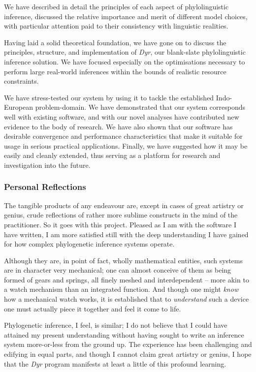 \documentclass[10pt,journal,compsoc]{IEEEtran}
\begin{document}
We have described in detail the principles of each aspect of phylolinguistic inference, discussed the relative importance and merit of different model choices, with particular attention paid to their consistency with linguistic realities.

Having laid a solid theoretical foundation, we have gone on to discuss the principles, structure, and implementation of \textit{Dyr}, our blank-slate phylolinguistic inference solution. We have focused especially on the optimisations necessary to perform large real-world inferences within the bounds of realistic resource constraints.

We have stress-tested our system by using it to tackle the established Indo-European problem-domain. We have demonstrated that our system corresponds well with existing software, and with our novel analyses have contributed new evidence to the body of research. We have also shown that our software has desirable convergence and performance characteristics that make it suitable for usage in serious practical applications. Finally, we have suggested how it may be easily and cleanly extended, thus serving as a platform for research and investigation into the future.

\subsubsection{Personal Reflections}

The tangible products of any endeavour are, except in cases of great artistry or genius, crude reflections of rather more sublime constructs in the mind of the practitioner. So it goes with this project. Pleased as I am with the software I have written, I am more satisfied still with the deep understanding I have gained for how complex phylogenetic inference systems operate.

Although they are, in point of fact, wholly mathematical entities, such systems are in character very mechanical; one can almost conceive of them as being formed of gears and springs, all finely meshed and interdependent -- more akin to a watch mechanism than an integrated function. And though one might \textit{know} how a mechanical watch works, it is established that to \textit{understand} such a device one must actually piece it together and feel it come to life.

Phylogenetic inference, I feel, is similar; I do not believe that I could have attained my present understanding without having sought to write an inference system more-or-less from the ground up. The experience has been challenging and edifying in equal parts, and though I cannot claim great artistry or genius, I hope that the \textit{Dyr} program manifests at least a little of this profound learning.



\end{document}

